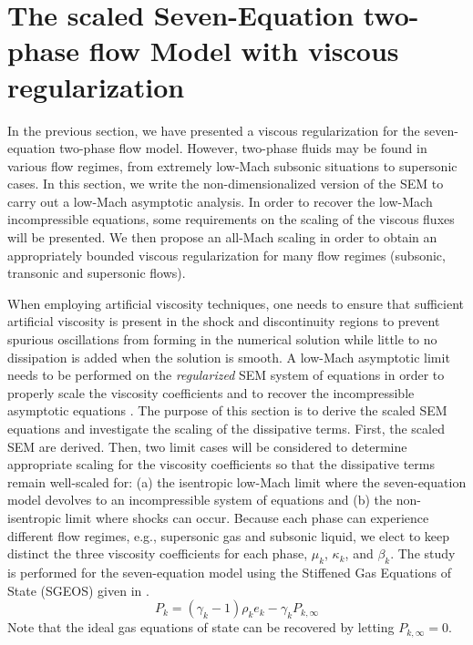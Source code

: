 \section{The scaled Seven-Equation two-phase flow Model with viscous regularization}\label{sec:low-Mach}
%
In the previous section, we have presented a viscous regularization for the seven-equation two-phase flow model.  However,
two-phase fluids may be found in various flow regimes, from extremely low-Mach subsonic situations to supersonic cases.
In this section, we write the non-dimensionalized version of the SEM to carry out a low-Mach asymptotic analysis. In order to 
recover the low-Mach incompressible equations, some requirements on the scaling of the viscous fluxes will be presented.  
We then propose an all-Mach scaling in order to obtain an appropriately bounded viscous regularization for many flow regimes
(subsonic, transonic and supersonic flows).

When employing artificial viscosity techniques, one needs to ensure that sufficient artificial viscosity is present in the shock 
and discontinuity regions to prevent spurious oscillations from forming in the numerical solution while little to no dissipation 
is added when the solution is smooth.
A low-Mach asymptotic limit needs to be performed on the {\it regularized} SEM system of equations in order to properly scale the viscosity 
coefficients and to recover the incompressible asymptotic equations \cite{LowMach1,LowMach2,LowMach3}. The purpose of this section is to 
derive the scaled SEM equations and investigate the scaling of the dissipative terms. 
First, the scaled SEM are derived. Then, two limit cases will be considered to determine 
appropriate scaling for the viscosity coefficients so that the dissipative terms remain well-scaled for: 
(a) the isentropic low-Mach limit where the seven-equation model devolves to an incompressible system of 
equations and (b) the non-isentropic limit where shocks can occur. 
Because each phase can experience different flow regimes, e.g., supersonic gas and subsonic liquid, we elect to keep distinct the three viscosity 
coefficients for each phase, $\mu_k$, $\kappa_k$, and $\beta_k$. The study is performed for the seven-equation model using the Stiffened Gas 
Equations of State (SGEOS) \cite{SGEOS} given in .
%
\begin{equation}\label{eq:SGEOS_bis}
P_k = \left( \gamma_k-1 \right) \rho_k e_k - \gamma_k P_{k,\infty}
\end{equation}
Note that the ideal gas equations of state can be recovered by letting $P_{k,\infty}=0$.
%
